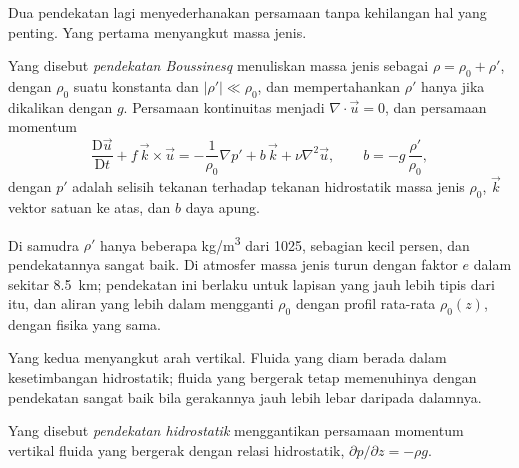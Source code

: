 \begin{omfigure}
\par{}\label{fig:b3:gfd-foundations:frame}
\end{omfigure}

Dua pendekatan lagi menyederhanakan persamaan tanpa kehilangan hal
yang penting. Yang pertama menyangkut massa jenis.

\begin{definition}\label{def:b3:gfd-foundations:boussinesq}
Yang disebut \emph{pendekatan Boussinesq} menuliskan
massa jenis sebagai $\rho = \rho_0 + \rho'$, dengan $\rho_0$ suatu konstanta dan
$|\rho'| \ll \rho_0$, dan mempertahankan $\rho'$ hanya jika dikalikan dengan $g$.
Persamaan kontinuitas menjadi $\nabla\cdot\vec u = 0$, dan
persamaan momentum
\[
\frac{\mathrm D\vec u}{\mathrm Dt} + f\,\vec k\times\vec u =
-\frac{1}{\rho_0}\nabla p' + b\,\vec k + \nu\nabla^2\vec u ,
\qquad b = -g\,\frac{\rho'}{\rho_0} ,
\]
dengan $p'$ adalah selisih tekanan terhadap tekanan hidrostatik
massa jenis $\rho_0$, $\vec k$ vektor satuan ke atas, dan $b$
daya apung.
\end{definition}

Di samudra $\rho'$ hanya beberapa \unit{kg/m^3} dari \num{1025}, sebagian kecil
persen, dan pendekatannya sangat baik. Di atmosfer massa jenis
turun dengan faktor $e$ dalam sekitar \qty{8.5}{km}; pendekatan ini berlaku untuk
lapisan yang jauh lebih tipis dari itu, dan aliran yang lebih dalam mengganti $\rho_0$ dengan
profil rata-rata $\rho_0(z)$, dengan fisika yang sama.

Yang kedua menyangkut arah vertikal. Fluida yang diam berada dalam
kesetimbangan hidrostatik; fluida yang bergerak tetap memenuhinya dengan pendekatan sangat baik bila
gerakannya jauh lebih lebar daripada dalamnya.

\begin{definition}\label{def:b3:gfd-foundations:hydrostatic}
Yang disebut \emph{pendekatan hidrostatik}
menggantikan persamaan momentum vertikal fluida yang bergerak dengan
relasi hidrostatik, $\partial p/\partial z = -\rho g$.
\end{definition}

